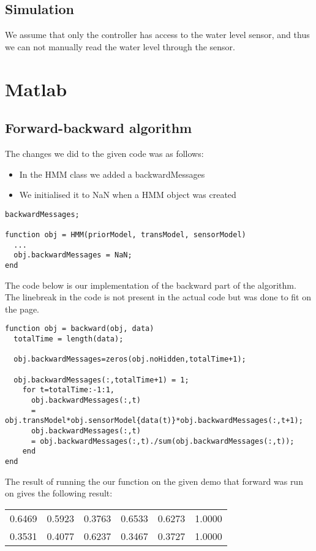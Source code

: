 \documentclass[colorlinks=true,linkcolor=blue]{article}
\begin{document}
\subsection{Simulation}
\label{sec-1-3}
We assume that only the controller has access to the water level sensor, and thus we can not manually read the water level through the sensor.

\section{Matlab}
\label{sec-2}
\subsection{Forward-backward algorithm}
\label{sec-2-1}
The changes we did to the given code was as follows:
\begin{itemize}
\item In the HMM class we added a backwardMessages
\item We initialised it to NaN when a HMM object was created
\end{itemize}
\begin{verbatim}
backwardMessages;

function obj = HMM(priorModel, transModel, sensorModel)
  ...
  obj.backwardMessages = NaN;
end
\end{verbatim}

The code below is our implementation of the backward part of the algorithm. The linebreak in the code is not present in the actual code but was done to fit on the page.

\begin{verbatim}
function obj = backward(obj, data)
  totalTime = length(data);

  obj.backwardMessages=zeros(obj.noHidden,totalTime+1);           

  obj.backwardMessages(:,totalTime+1) = 1;
    for t=totalTime:-1:1,
      obj.backwardMessages(:,t) 
      = obj.transModel*obj.sensorModel{data(t)}*obj.backwardMessages(:,t+1);
      obj.backwardMessages(:,t) 
      = obj.backwardMessages(:,t)./sum(obj.backwardMessages(:,t));
    end
end
\end{verbatim}

The result of running the our function on the given demo that forward was run on gives the following result:

\begin{center}
\begin{tabular}{rrrrrr}
0.6469 & 0.5923 & 0.3763 & 0.6533 & 0.6273 & 1.0000\\
0.3531 & 0.4077 & 0.6237 & 0.3467 & 0.3727 & 1.0000\\
\end{tabular}
\end{center}
\end{document}
